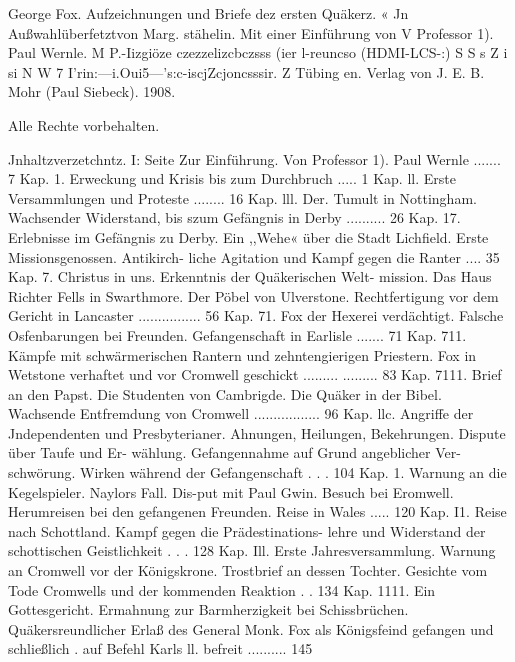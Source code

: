 George Fox.
Aufzeichnungen und Briefe dez ersten Quäkerz.
« Jn Außwahlüberfetztvon
Marg. stähelin.
Mit einer Einführung von
V Professor 1). Paul Wernle.
M
P.-Iizgiöze czezzelizcbczsss (ier l-reuncso
(HDMI-LCS-:)
S S s Z i si N W 7
I’rin:—i.Oui5—’s:c-iscjZcjoncsssir. Z
Tübing en.
Verlag von J. E. B. Mohr (Paul Siebeck).
1908.



Alle Rechte vorbehalten.



Jnhaltzverzetchntz.
I: Seite
Zur Einführung. Von Professor 1). Paul Wernle ....... 7
Kap. 1. Erweckung und Krisis bis zum Durchbruch ..... 1
Kap. ll. Erste Versammlungen und Proteste ........ 16
Kap. lll. Der. Tumult in Nottingham. Wachsender Widerstand,
bis szum Gefängnis in Derby .......... 26
Kap. 17. Erlebnisse im Gefängnis zu Derby. Ein ,,Wehe« über
die Stadt Lichfield. Erste Missionsgenossen. Antikirch-
liche Agitation und Kampf gegen die Ranter .... 35
Kap. 7. Christus in uns. Erkenntnis der Quäkerischen Welt-
mission. Das Haus Richter Fells in Swarthmore. Der
Pöbel von Ulverstone. Rechtfertigung vor dem Gericht
in Lancaster ................ 56
Kap. 71. Fox der Hexerei verdächtigt. Falsche Osfenbarungen bei
Freunden. Gefangenschaft in Earlisle ....... 71
Kap. 711. Kämpfe mit schwärmerischen Rantern und zehntengierigen
Priestern. Fox in Wetstone verhaftet und vor Cromwell
geschickt .........   ......... 83
Kap. 7111. Brief an den Papst. Die Studenten von Cambrigde.
Die Quäker in der Bibel. Wachsende Entfremdung von
Cromwell ................. 96
Kap. llc. Angriffe der Jndependenten und Presbyterianer. Ahnungen,
Heilungen, Bekehrungen. Dispute über Taufe und Er-
wählung. Gefangennahme auf Grund angeblicher Ver-
schwörung. Wirken während der Gefangenschaft . . . 104
Kap. 1. Warnung an die Kegelspieler. Naylors Fall. Dis-put
mit Paul Gwin. Besuch bei Eromwell. Herumreisen bei
den gefangenen Freunden. Reise in Wales ..... 120
Kap. I1. Reise nach Schottland. Kampf gegen die Prädestinations-
lehre und Widerstand der schottischen Geistlichkeit . . . 128
Kap. Ill. Erste Jahresversammlung. Warnung an Cromwell vor
der Königskrone. Trostbrief an dessen Tochter. Gesichte
vom Tode Cromwells und der kommenden Reaktion . . 134
Kap. 1111. Ein Gottesgericht. Ermahnung zur Barmherzigkeit bei
Schissbrüchen. Quäkersreundlicher Erlaß des General
Monk. Fox als Königsfeind gefangen und schließlich .
auf Befehl Karls ll. befreit .......... 145


